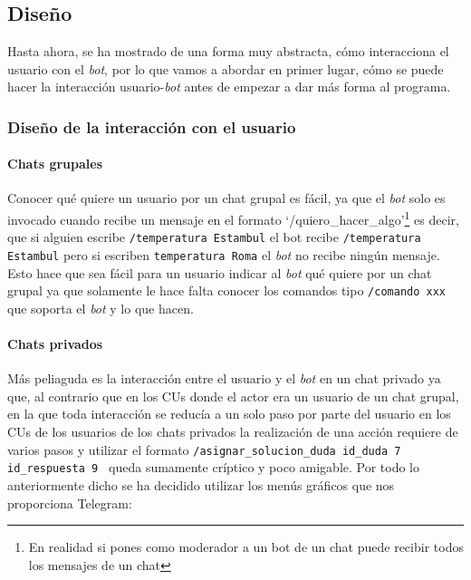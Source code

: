 \chapter{}

\section{Diseño}

Hasta ahora, se ha mostrado de una forma muy abstracta, cómo interacciona el usuario con el \textit{bot}, por lo que vamos a abordar en primer lugar, cómo se puede hacer la interacción usuario-\textit{bot} antes de empezar a dar más forma al programa.

\subsection{Diseño de la interacción con el usuario}

\subsubsection{Chats grupales}
Conocer qué quiere un usuario por un chat grupal es fácil, ya que el \textit{bot} solo es invocado cuando recibe un mensaje en el formato \enquote*{/quiero\_hacer\_algo}\footnote{En realidad si pones como moderador a un bot de un chat puede recibir todos los mensajes de un chat}  es decir, que si alguien escribe \texttt{/temperatura Estambul} el bot recibe \texttt{/temperatura Estambul} pero si escriben \texttt{temperatura Roma} el \textit{bot} no recibe ningún mensaje. Esto hace que sea fácil para un usuario indicar al \textit{bot}  qué quiere por un chat grupal ya que solamente le hace falta conocer los comandos tipo \texttt{/comando xxx} que soporta el \textit{bot} y lo que hacen.
\subsubsection{Chats privados}

Más peliaguda es la interacción entre el usuario y el \textit{bot} en un chat privado  ya que, al contrario que en los CUs donde el actor era un usuario de un chat grupal, en la que toda interacción se reducía a un solo paso por parte del usuario en los CUs de los usuarios de los chats privados la realización de una acción requiere de varios pasos y utilizar el formato \texttt{/asignar\_solucion\_duda id\_duda 7 id\_respuesta 9 } queda sumamente críptico y poco amigable. Por todo lo anteriormente dicho se ha decidido utilizar los menús gráficos que nos proporciona Telegram:


